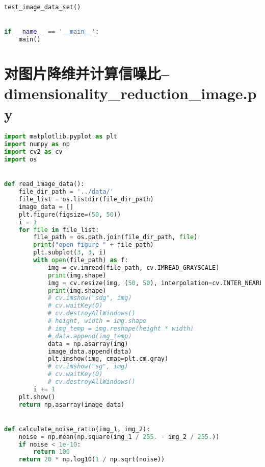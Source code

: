 \documentclass{hitreport}
\begin{document}
\begin{appendices}
\begin{lstlisting}[language=python]
    test_image_data_set()


if __name__ == '__main__':
    main()


\end{lstlisting}

\section{对图片降维并计算信噪比--dimensionality\_reduction\_image.py}\label{app:main}
\begin{lstlisting}[language=python]
import matplotlib.pyplot as plt
import numpy as np
import cv2 as cv
import os


def read_image_data():
    file_dir_path = '../data/'
    file_list = os.listdir(file_dir_path)
    image_data = []
    plt.figure(figsize=(50, 50))
    i = 1
    for file in file_list:
        file_path = os.path.join(file_dir_path, file)
        print("open figure " + file_path)
        plt.subplot(3, 3, i)
        with open(file_path) as f:
            img = cv.imread(file_path, cv.IMREAD_GRAYSCALE)
            print(img.shape)
            img = cv.resize(img, (50, 50), interpolation=cv.INTER_NEAREST)
            print(img.shape)
            # cv.imshow("sdg", img)
            # cv.waitKey(0)
            # cv.destroyAllWindows()
            # height, width = img.shape
            # img_temp = img.reshape(height * width)
            # data.append(img_temp)
            data = np.asarray(img)
            image_data.append(data)
            plt.imshow(img, cmap=plt.cm.gray)
            # cv.imshow("sg", img)
            # cv.waitKey(0)
            # cv.destroyAllWindows()
        i += 1
    plt.show()
    return np.asarray(image_data)


def calculate_noise_ratio(img_1, img_2):
    noise = np.mean(np.square(img_1 / 255. - img_2 / 255.))
    if noise < 1e-10:
        return 100
    return 20 * np.log10(1 / np.sqrt(noise))


\end{lstlisting}


\end{appendices}
\end{document}
